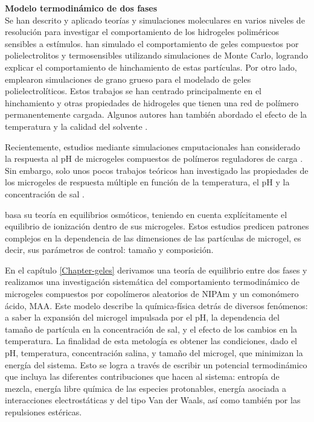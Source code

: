 \textbf{Modelo termodin\'amico de dos fases} \\
Se han descrito y aplicado teor\'ias y simulaciones moleculares en varios niveles de resoluci\'on para investigar el comportamiento de los hidrogeles polim\'ericos sensibles a est\'imulos.
\citet{quesada2011gel} han simulado el comportamiento de geles compuestos por polielectrolitos y termosensibles utilizando simulaciones de Monte Carlo, logrando explicar el comportamiento de hinchamiento de estas part\'iculas. Por otro lado, \citet{ahualli2016coarse} emplearon simulaciones de grano grueso para el modelado de geles polielectrol\'iticos. Estos trabajos se han centrado principalmente en el hinchamiento y otras propiedades de hidrogeles que tienen una red de pol\'imero permanentemente cargada. Algunos autores han tambi\'en abordado el efecto de la temperatura y la calidad del solvente \cite{Jha2011, QuesadaPerez2013, moncho-jorda2016a, ahualli2016coarse, AdroherBenitez2017PCCP}.

Recientemente, estudios mediante simulaciones cmputacionales han considerado la respuesta al pH de microgeles compuestos de pol\'imeros reguladores de carga \cite{Schroeder2015,Rud2017,Sean2018, Hofzumahaus2018,Lu2019}.
Sin embargo, solo unos pocos trabajos te\'oricos han investigado las propiedades de los microgeles de respuesta m\'ultiple en funci\'on de la temperatura, el pH y la concentraci\'on de sal \cite{CaprilesGonzalez2008,polotsky2013collapse}.

\citet{polotsky2013collapse} basa su teor\'ia en equilibrios osm\'oticos, teniendo en cuenta expl\'icitamente el equilibrio de ionizaci\'on dentro de sus microgeles. Estos estudios predicen patrones complejos en la dependencia de las dimensiones de las part\'iculas de microgel, es decir, sus par\'ametros de control: tama\~no y composici\'on.

En el cap\'itulo \ref{Chapter-geles} derivamos una teor\'ia de equilibrio entre dos fases y realizamos una investigaci\'on sistem\'atica del comportamiento termodin\'amico de microgeles compuestos por copol\'imeros aleatorios de NIPAm y un comon\'omero \'acido, MAA. Este modelo describe la qu\'imica-f\'isica detr\'as de diversos fen\'omenos: a saber la expansi\'on del microgel impulsada por el pH, la dependencia del tama\~no de part\'icula en la concentraci\'on de sal, y el efecto de los cambios en la temperatura. La finalidad de esta metolog\'ia es obtener las condiciones, dado el pH, temperatura, concentraci\'on salina, y tama\~no del microgel, que minimizan la energ\'ia  del sistema. Esto se logra a  trav\'es de escribir un potencial termodin\'amico que incluya las diferentes contribuciones que hacen al sistema: entrop\'ia de mezcla, energ\'ia libre qu\'imica de las especies protonables, energ\'ia asociada a interacciones electrost\'aticas y del tipo Van der Waals, as\'i  como tambi\'en por las repulsiones est\'ericas.  


